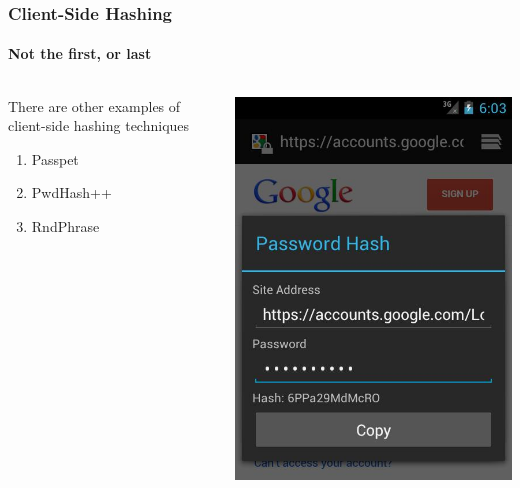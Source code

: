 \documentclass[handout, notes=hide]{beamer}
\begin{document}

\begin{frame}
\frametitle{Client-Side Hashing}
\framesubtitle{Not the first, or last}
\setlength{\parskip}{0.5em}

\begin{columns}[T]
\begin{column}[T]{0.6\textwidth}
\setlength{\parskip}{0.5em}
There are other examples of client-side hashing techniques
\begin{enumerate}
\item Passpet
\item PwdHash++
\item RndPhrase
\end{enumerate}
\end{column}
\begin{column}[T]{0.4\textwidth}
\vspace{0.0em}
\includegraphics[width=1.0\textwidth]{android}
\end{column}
\end{columns}


\end{frame}
\end{document}
